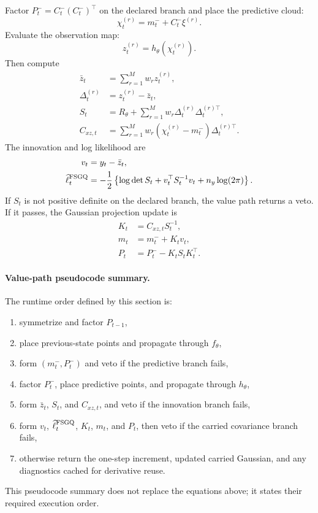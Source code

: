 \documentclass[11pt]{article}
\numberwithin{equation}{section}
\newcommand{\ellhat}{\widehat\ell}
\begin{document}
Factor \(P_t^-=C_t^-(C_t^-)^\top\) on the declared branch and place the
predictive cloud:
\begin{equation}
  \chi_t^{(r)}
  =
  m_t^-+C_t^-\xi^{(r)}.
  \label{eq:p31-obs-placed-points}
\end{equation}
Evaluate the observation map:
\begin{equation}
  z_t^{(r)}=h_\theta(\chi_t^{(r)}).
  \label{eq:p31-obs-values}
\end{equation}
Then compute
\begin{align}
  \bar z_t&=\sum_{r=1}^Mw_rz_t^{(r)},
  \label{eq:p31-obs-mean}\\
  \Delta_t^{(r)}&=z_t^{(r)}-\bar z_t,
  \label{eq:p31-obs-centered}\\
  S_t&=R_\theta+\sum_{r=1}^Mw_r
  \Delta_t^{(r)}\Delta_t^{(r)\top},
  \label{eq:p31-obs-cov}\\
  C_{xz,t}&=\sum_{r=1}^Mw_r
  (\chi_t^{(r)}-m_t^-)\Delta_t^{(r)\top}.
  \label{eq:p31-cross-cov}
\end{align}
The innovation and log likelihood are
\begin{align}
  v_t&=y_t-\bar z_t,
  \label{eq:p31-innovation}\\
  \ellhat_t^{\rm FSGQ}
  &=
  -\frac12
  \left\{\log\det S_t+v_t^\top S_t^{-1}v_t+n_y\log(2\pi)\right\}.
  \label{eq:p31-fsgq-loglik}
\end{align}
If \(S_t\) is not positive definite on the declared branch, the value path
returns a veto.  If it passes, the Gaussian projection update is
\begin{align}
  K_t&=C_{xz,t}S_t^{-1},
  \label{eq:p31-kalman-gain}\\
  m_t&=m_t^-+K_tv_t,
  \label{eq:p31-filter-mean}\\
  P_t&=P_t^- - K_tS_tK_t^\top.
  \label{eq:p31-filter-cov}
\end{align}

\paragraph{Value-path pseudocode summary.}
The runtime order defined by this section is:
\begin{enumerate}[leftmargin=0.28in]
  \item symmetrize and factor \(P_{t-1}\),
  \item place previous-state points and propagate through \(f_\theta\),
  \item form \((m_t^-,P_t^-)\) and veto if the predictive branch fails,
  \item factor \(P_t^-\), place predictive points, and propagate through
  \(h_\theta\),
  \item form \(\bar z_t\), \(S_t\), and \(C_{xz,t}\), and veto if the
  innovation branch fails,
  \item form \(v_t\), \(\ellhat_t^{\rm FSGQ}\), \(K_t\), \(m_t\), and \(P_t\),
  then veto if the carried covariance branch fails,
  \item otherwise return the one-step increment, updated carried Gaussian, and
  any diagnostics cached for derivative reuse.
\end{enumerate}
This pseudocode summary does not replace the equations above; it states their
required execution order.
\end{document}

